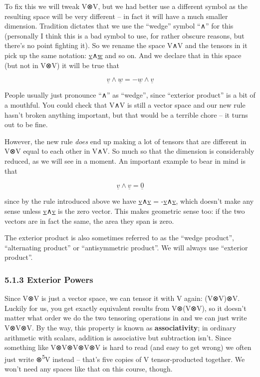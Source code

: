 \documentclass[oneside,english]{amsbook}
\numberwithin{section}{chapter}
\theoremstyle{plain}
\theoremstyle{definition}
\begin{document}
To fix this we will tweak V⊗V, but we had better use a different symbol
as the resulting space will be very different -- in fact it will have a
much smaller dimension. Tradition dictates that we use the ``wedge''
symbol ``∧'' for this (personally I think this is a bad symbol to use,
for rather obscure reasons, but there's no point fighting it). So we
rename the space V∧V and the tensors in it pick up the same notation:
\ul{v}∧\ul{w} and so on. And we declare that in this space (but not in
V⊗V) it will be true that

\[\underline{v} \land \underline{w} = - \underline{w} \land \underline{v}\]

People usually just pronounce ``∧'' as ``wedge'', since ``exterior
product'' is a bit of a mouthful. You could check that V∧V is still a
vector space and our new rule hasn't broken anything important, but that
would be a terrible chore -- it turns out to be fine.

However, the new rule \emph{does} end up making a lot of tensors that
are different in V⊗V equal to each other in V∧V. So much so that the
dimension is considerably reduced, as we will see in a moment. An
important example to bear in mind is that

\[\underline{v} \land \underline{v} = \underline{0}\]

since by the rule introduced above we have \ul{v}∧\ul{v} =
-\ul{v}∧\ul{v}, which doesn't make any sense unless \ul{v}∧\ul{v} is the
zero vector. This makes geometric sense too: if the two vectors are in
fact the same, the area they span is zero.

The exterior product is also sometimes referred to as the ``wedge
product'', ``alternating product'' or ``antisymmetric product''. We will
always use ``exterior product''.

\subsubsection{5.1.3 Exterior Powers}\label{exterior-powers}

Since V⊗V is just a vector space, we can tensor it with V again:
(V⊗V)⊗V. Luckily for us, you get exactly equivalent results from
V⊗(V⊗V), so it doesn't matter what order we do the two tensoring
operations in and we can just write V⊗V⊗V. By the way, this property is
known as \textbf{associativity}; in ordinary arithmetic with scalars,
addition is associative but subtraction isn't. Since something like
V⊗V⊗V⊗V⊗V is hard to read (and easy to get wrong) we often just write
⊗\textsuperscript{5}V instead -- that's five copies of V
tensor-producted together. We won't need any spaces like that on this
course, though.
\end{document}
